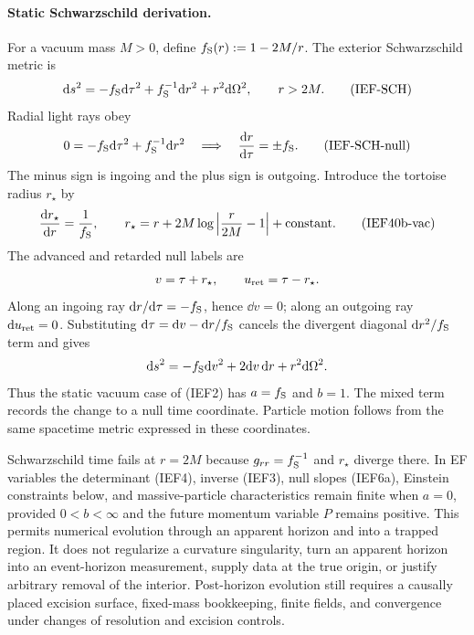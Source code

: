 \paragraph{Static Schwarzschild derivation.}
For a vacuum mass \(M>0\), define
\(f_{\rm S}(r):=1-2M/r\).  The exterior Schwarzschild metric is
\[
 \mathrm d s^2=-f_{\rm S}\mathrm d\tau^2+f_{\rm S}^{-1}\mathrm d r^2
          +r^2\mathrm d\Omega^2,\qquad r>2M.                    \tag{IEF-SCH}
\]
Radial light rays obey
\[
 0=-f_{\rm S}\mathrm d\tau^2+f_{\rm S}^{-1}\mathrm d r^2
 \quad\Longrightarrow\quad
 \frac{\mathrm d r}{\mathrm d\tau}=\pm f_{\rm S}.                     \tag{IEF-SCH-null}
\]
The minus sign is ingoing and the plus sign is outgoing.  Introduce the
tortoise radius \(r_\star\) by
\[
 \frac{\mathrm d r_\star}{\mathrm d r}=\frac1{f_{\rm S}},\qquad
 r_\star=r+2M\log\left|\frac{r}{2M}-1\right|+\mathrm{constant}. \tag{IEF40b-vac}
\]
The advanced and retarded null labels are
\[
       v=\tau+r_\star,\qquad u_{\rm ret}=\tau-r_\star.
\]
Along an ingoing ray \(\mathrm d r/\mathrm d\tau=-f_{\rm S}\), hence \(\dd v=0\);
along an outgoing ray \(\mathrm d u_{\rm ret}=0\).  Substituting
\(\mathrm d\tau=\mathrm d v-\mathrm d r/f_{\rm S}\) cancels the divergent diagonal
\(\mathrm d r^2/f_{\rm S}\) term and gives
\[
 \mathrm d s^2=-f_{\rm S}\mathrm d v^2+2\mathrm d v\,\mathrm d r+r^2\mathrm d\Omega^2.
\]
Thus the static vacuum case of (IEF2) has
\(a=f_{\rm S}\) and \(b=1\).  The mixed term records the change to a null time coordinate.  Particle
motion follows from the same spacetime metric expressed in these coordinates.

Schwarzschild time fails at \(r=2M\) because
\(g_{rr}=f_{\rm S}^{-1}\) and \(r_\star\) diverge there.  In EF variables
the determinant (IEF4), inverse (IEF3), null slopes (IEF6a), Einstein
constraints below, and massive-particle characteristics remain finite when
\(a=0\), provided \(0<b<\infty\) and the future momentum variable \(P\)
remains positive.  This permits numerical evolution through an apparent
horizon and into a trapped region.  It does not regularize a curvature
singularity, turn an apparent horizon into an event-horizon measurement,
supply data at the true origin, or justify arbitrary removal of the interior.
Post-horizon evolution still requires a causally placed excision surface,
fixed-mass bookkeeping, finite fields, and convergence under changes of
resolution and excision controls.

